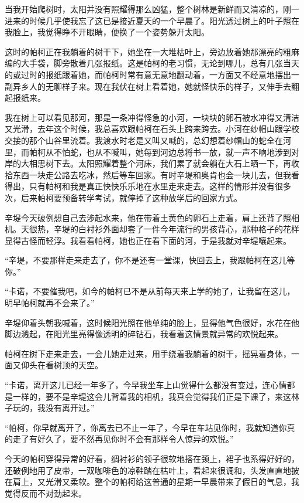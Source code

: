 \par 当我开始爬树时，太阳并没有照耀得那么凶猛，整个树林是新鲜而又清凉的，刚一进来的时候几乎使我忘了这已是接近夏天的一个早晨了。阳光透过树上的叶子照在我脸上，我觉得睁不开眼睛，便换了一个姿势躲开太阳。
\par 这时的帕柯正在我躺着的树干下，她坐在一大堆枯叶上，旁边放着她那漂亮的粗麻编的大手袋，脚旁散着几张报纸。这是帕柯的老习惯，无论到哪儿，总有几张当天的或过时的报纸跟着她，而帕柯时常有意无意地翻动着，一方面又不经意地摆出一副异乡人的无聊样子来。现在我伏在树上看着她，她就怪快乐的样子，又伸手去翻起报纸来。
\par 我在树上可以看见那河，那是一条冲得怪急的小河，一块块的卵石被水冲得又清洁又光滑，去年这个时候，我总喜欢跟帕柯在石头上跨来跨去。小河在纱帽山跟学校交接的那个山谷里流着。我渡水时老是又叫又喊的，总幻想着纱帽山的蛇全在河里，而帕柯从不怕蛇，也从不喊叫，她每到河边总将书一放，就一声不响地涉到对岸的大相思树下去。太阳照耀着整个河床，我们累了就会躺在大石上晒一下，再收拾东西一块走公路去吃冰，然后等车回家。有时辛堤和奥肯也会一块儿去，但我看得出，只有帕柯和我是真正快快乐乐地在水里走来走去。这样的情形并没有很多次，后来帕柯要预备转学考试，就停掉了这种放学后的回家方式。
\par 辛堤今天破例想自己去涉起水来，他在带着土黄色的卵石上走着，肩上还背了照相机。天很热，辛堤的白衬衫外面却套了一件今年流行的男孩背心，那种格子的花样显得古怪而轻浮。我看看帕柯，她也正在看下面的河，于是我就对辛堤嚷起来。
\par “辛堤，不要那样走来走去了，你不是还有一堂课，快回去上，我跟帕柯在这儿等你。”
\par “卡诺，不要催我吧，如今的帕柯已不是从前每天来上学的她了，让我留在这儿，明早帕柯就再不会来了。”
\par 辛堤仰着头朝我喊着，这时候阳光照在他单纯的脸上，显得他气色很好，水花在他脚边溅起，在阳光里亮得像透明的碎钻石，我看着这情景就异常的欢悦起来。
\par 帕柯在树下走来走去，一会儿她走过来，用手绕着我躺着的树干，摇晃着身体，一面又仰头在看树顶的天空。
\par “卡诺，离开这儿已经一年多了，今早我坐车上山觉得什么都没有变过，连心情都是一样的，要不是辛堤这会儿背着我的相机，我真会觉得我们正是下课了，来这林子玩的，我没有离开过。”
\par “帕柯，你早就离开了，你离去已不止一年了，今早在车站见你时，我就知道你真的走了有好久了，要不然再见你时不会有那样令人惊异的欢悦。”
\par 今天的帕柯穿得异常的好看，绸衬衫的领子很软地搭在颈上，裙子也系得好好的，还破例地用了皮带，一双咖啡色的凉鞋踏在枯叶上，看起来很调和，头发直直地披在肩上，又光滑又柔软。整个的帕柯给这普通的星期一早晨带来了假日的气息，我觉得反而不对劲起来。
